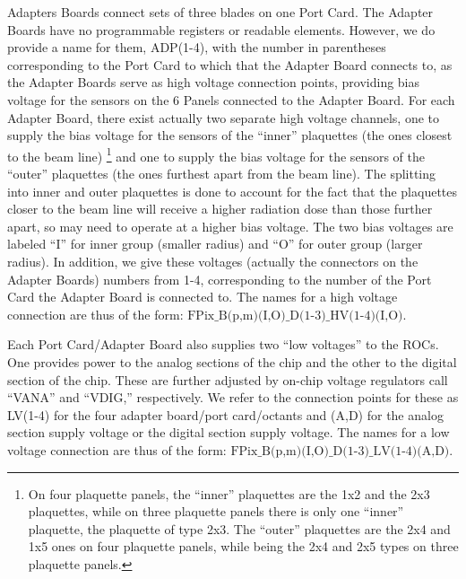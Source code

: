\documentclass{cmspaper}
\begin{document}
Adapters Boards connect sets of three blades on one Port Card. 
The Adapter Boards have no programmable registers or readable elements. However, we do provide
a name for them, ADP(1-4), 
with the number in parentheses corresponding to the Port Card to which that the Adapter Board connects to,
as the Adapter Boards serve as high voltage connection points, 
providing bias voltage for the sensors on the 6 Panels connected to the Adapter Board.
For each Adapter Board, there exist actually two separate high voltage channels,
one to supply the bias voltage for the sensors of the ``inner'' plaquettes (the ones closest to the beam line)
\footnote{On four plaquette panels, the ``inner'' plaquettes are the 1x2 and the 2x3 plaquettes,
          while on three plaquette panels there is only one ``inner'' plaquette, the plaquette of type 2x3.
          The ``outer'' plaquettes are the 2x4 and 1x5 ones on four plaquette panels,
          while being the 2x4 and 2x5 types on three plaquette panels.}
and one to supply the bias voltage for the sensors of the ``outer'' plaquettes (the ones furthest apart from the beam line).
The splitting into inner and outer plaquettes is done to account for the fact that the plaquettes closer to the beam line
will receive a higher radiation dose than those further apart,
so may need to operate at a higher bias voltage.
The two bias voltages are labeled ``I'' for inner
group (smaller radius) and ``O'' for outer group (larger radius). 
In addition, we give these voltages (actually the connectors on the Adapter Boards) numbers from 1-4,
corresponding to the number of the Port Card the Adapter Board is connected to.
The names for a high voltage connection are thus of the form:
$\mbox{FPix\_B(p,m)(I,O)\_D(1-3)\_HV(1-4)(I,O).}$

Each Port Card/Adapter Board also supplies two ``low voltages'' to the ROCs.
One provides power to the analog sections of the chip and the other to the digital
section of the chip. These are further adjusted by on-chip voltage regulators
call ``VANA'' and ``VDIG,'' respectively. We refer to the connection points
for these as LV(1-4) for the four adapter board/port card/octants and (A,D) for the
analog section supply voltage or the digital section supply voltage.
The names for a low voltage connection are thus of the form:
$\mbox{FPix\_B(p,m)(I,O)\_D(1-3)\_LV(1-4)(A,D).}$

\end{document}

